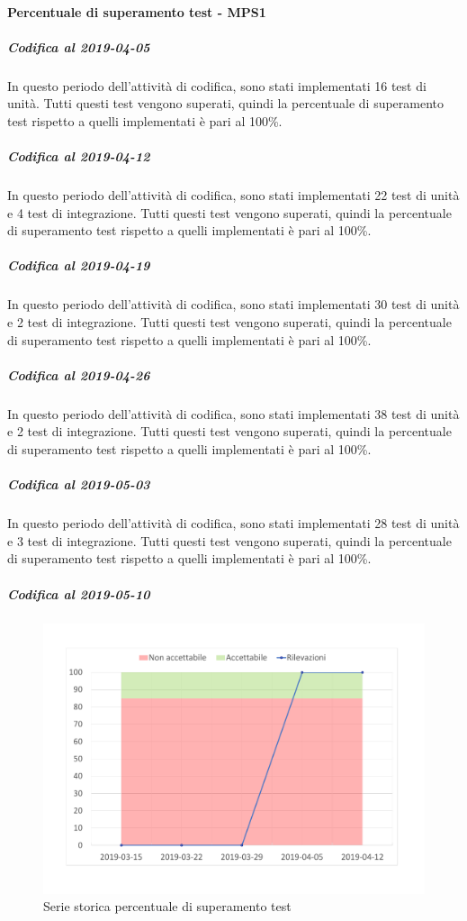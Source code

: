 \paragraph{Percentuale di superamento test - MPS1}
\subparagraph{Codifica al 2019-04-05}
In questo periodo dell'attività di codifica, sono stati implementati 16 test di unità. Tutti questi test vengono superati, quindi la percentuale di superamento test rispetto a quelli implementati è pari al 100\%.

\subparagraph{Codifica al 2019-04-12}
In questo periodo dell'attività di codifica, sono stati implementati 22 test di unità e 4 test di integrazione. Tutti questi test vengono superati, quindi la percentuale di superamento test rispetto a quelli implementati è pari al 100\%.

\subparagraph{Codifica al 2019-04-19}
In questo periodo dell'attività di codifica, sono stati implementati 30 test di unità e 2 test di integrazione. Tutti questi test vengono superati, quindi la percentuale di superamento test rispetto a quelli implementati è pari al 100\%.

\subparagraph{Codifica al 2019-04-26}
In questo periodo dell'attività di codifica, sono stati implementati 38 test di unità e 2 test di integrazione. Tutti questi test vengono superati, quindi la percentuale di superamento test rispetto a quelli implementati è pari al 100\%.


\subparagraph{Codifica al 2019-05-03}
In questo periodo dell'attività di codifica, sono stati implementati 28 test di unità e 3 test di integrazione. Tutti questi test vengono superati, quindi la percentuale di superamento test rispetto a quelli implementati è pari al 100\%.

\subparagraph{Codifica al 2019-05-10}



\begin{figure}[H]
	\centering
	\includegraphics[scale=0.6]{images/resoconto/MPS1Chart.pdf}
	\caption{Serie storica percentuale di superamento test}	
\end{figure}

